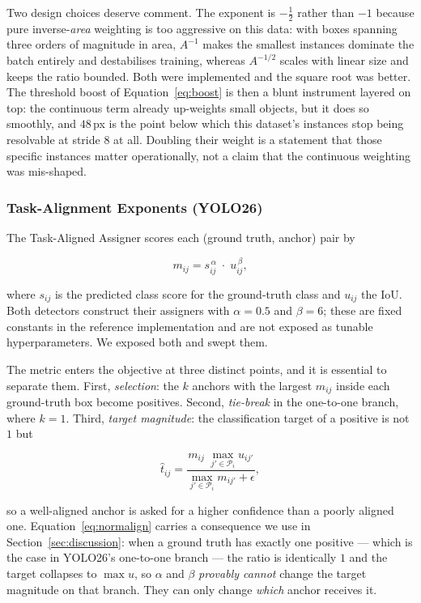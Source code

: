 \documentclass[10pt,twocolumn,a4paper]{article}
\begin{document}
Two design choices deserve comment. The exponent is $-\tfrac12$ rather than $-1$
because pure inverse-\emph{area} weighting is too aggressive on this data: with
boxes spanning three orders of magnitude in area, $A^{-1}$ makes the smallest
instances dominate the batch entirely and destabilises training, whereas
$A^{-1/2}$ scales with linear size and keeps the ratio bounded. Both were
implemented and the square root was better. The threshold boost of
Equation~\eqref{eq:boost} is then a blunt instrument layered on top: the
continuous term already up-weights small objects, but it does so smoothly, and
$48$\,px is the point below which this dataset's instances stop being resolvable
at stride $8$ at all. Doubling their weight is a statement that those specific
instances matter operationally, not a claim that the continuous weighting was
mis-shaped.

\subsubsection{Task-Alignment Exponents (YOLO26)}

The Task-Aligned Assigner \cite{tood2021} scores each (ground truth, anchor) pair by

\begin{equation}
m_{ij} = s_{ij}^{\,\alpha}\;\cdot\;u_{ij}^{\,\beta},
\label{eq:align}
\end{equation}

\noindent where $s_{ij}$ is the predicted class score for the ground-truth
class and $u_{ij}$ the IoU. Both detectors construct their assigners with
$\alpha = 0.5$ and $\beta = 6$; these are fixed constants in the reference
implementation and are not exposed as tunable hyperparameters. We exposed both
and swept them.

The metric enters the objective at three distinct points, and it is essential to
separate them. First, \emph{selection}: the $k$ anchors with the largest
$m_{ij}$ inside each ground-truth box become positives. Second, \emph{tie-break}
in the one-to-one branch, where $k=1$. Third, \emph{target magnitude}: the
classification target of a positive is not $1$ but

\begin{equation}
\hat{t}_{ij}
= \frac{m_{ij}\;\max_{j' \in \mathcal{P}_i} u_{ij'}}
       {\max_{j' \in \mathcal{P}_i} m_{ij'} + \epsilon},
\label{eq:normalign}
\end{equation}

\noindent so a well-aligned anchor is asked for a higher confidence than a
poorly aligned one. Equation~\eqref{eq:normalign} carries a consequence we use
in Section~\ref{sec:discussion}: when a ground truth has exactly one positive
--- which is the case in YOLO26's one-to-one branch --- the ratio is identically
$1$ and the target collapses to $\max u$, so $\alpha$ and $\beta$ \emph{provably
cannot} change the target magnitude on that branch. They can only change
\emph{which} anchor receives it.
\end{document}
